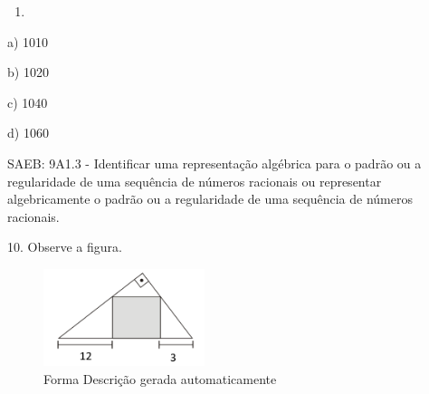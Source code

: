 \begin{escolha}
\begin{boxmedio}
\begin{boxmedio}
{\begin{boxpeq}
\begin{boxpeq}
{\begin{boxpeq}
\begin{boxmedio}
\begin{boxmedio}
\begin{boxpeq}
\begin{boxmedio}
\begin{boxpeq}
\begin{boxpeq}
\begin{boxpeq}
\begin{boxpeq}
\begin{boxmedio}
{\begin{boxmedio}
\begin{boxmedio}
\begin{boxpeq}
\begin{boxmedio}
\begin{boxpeq}
\begin{boxpeq}
\begin{boxpeq}
\begin{escolha}
{\begin{boxmedio}
\begin{boxpeq}
\begin{boxpeq}
\begin{boxpeq}
\begin{boxpeq}
\begin{boxpeq}
\begin{boxmedio}
\begin{boxpeq}
\begin{boxpeq}
\begin{boxpeq}
{\begin{boxpeq}
\begin{boxmedio}
\begin{boxpeq}
\begin{boxpeq}
\begin{boxpeq}
{\begin{boxpeq}
\begin{boxmedio}
{\begin{boxpeq}
\begin{boxpeq}
\begin{boxmedio}
\begin{boxmedio}
\begin{boxpeq}
\begin{boxpeq}
{\begin{boxpeq}
\begin{boxpeq}
\begin{boxpeq}
\begin{boxpeq}
\begin{boxpeq}
\begin{escolha}
\begin{escolha}
{\begin{boxmedio}
\begin{boxpeq}
\begin{q°}
\begin{boxmedio}
\begin{boxpeq}
\begin{boxpeq}
\begin{boxmedio}
\begin{boxmedio}
\begin{boxmedio}
\begin{boxmedio}
{\begin{escolha}
\begin{escolha}
\begin{escolha}
\begin{escolha}
\begin{escolha}
\begin{escolha}
{\begin{enumerate}
\num{\Alph{enumi}.}
\setcounter{enumi}{2}
\tightlist
\item
\end{enumerate}

a) 1010

b) 1020

c) 1040

d) 1060

SAEB: 9A1.3 - Identificar uma representação algébrica para o padrão ou a
regularidade de uma sequência de números racionais ou representar
algebricamente o padrão ou a regularidade de uma sequência de números
racionais.

10. Observe a figura.

\begin{figure}
\centering
\includegraphics[width=1.85417in,height=1.11601in]{./_SAEB_9_MAT/media/image272.png}
\caption{Forma Descrição gerada automaticamente}

\end{figure}}
\end{escolha}
\end{escolha}
\end{escolha}
\end{escolha}
\end{escolha}
\end{escolha}}
\end{boxmedio}
\end{boxmedio}
\end{boxmedio}
\end{boxmedio}
\end{boxpeq}
\end{boxpeq}
\end{boxmedio}
\end{q°}
\end{boxpeq}
\end{boxmedio}}
\end{escolha}
\end{escolha}
\end{boxpeq}
\end{boxpeq}
\end{boxpeq}
\end{boxpeq}
\end{boxpeq}}
\end{boxpeq}
\end{boxpeq}
\end{boxmedio}
\end{boxmedio}
\end{boxpeq}
\end{boxpeq}}
\end{boxmedio}
\end{boxpeq}}
\end{boxpeq}
\end{boxpeq}
\end{boxpeq}
\end{boxmedio}
\end{boxpeq}}
\end{boxpeq}
\end{boxpeq}
\end{boxpeq}
\end{boxmedio}
\end{boxpeq}
\end{boxpeq}
\end{boxpeq}
\end{boxpeq}
\end{boxpeq}
\end{boxmedio}}
\end{escolha}
\end{boxpeq}
\end{boxpeq}
\end{boxpeq}
\end{boxmedio}
\end{boxpeq}
\end{boxmedio}
\end{boxmedio}}
\end{boxmedio}
\end{boxpeq}
\end{boxpeq}
\end{boxpeq}
\end{boxpeq}
\end{boxmedio}
\end{boxpeq}
\end{boxmedio}
\end{boxmedio}
\end{boxpeq}}
\end{boxpeq}
\end{boxpeq}}
\end{boxmedio}
\end{boxmedio}
\end{escolha}
